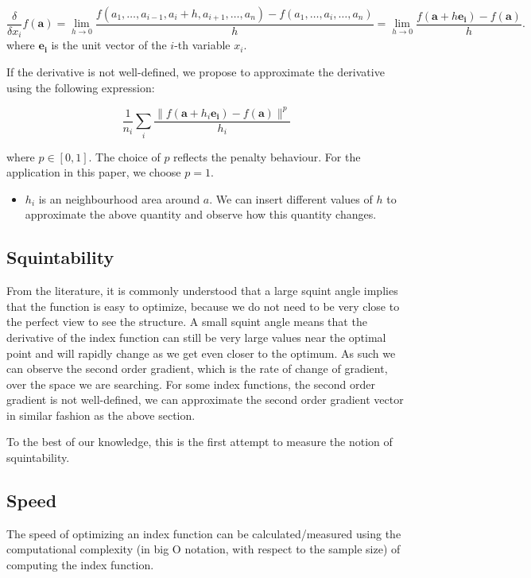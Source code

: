 \documentclass[
  number,
  preprint,
  3p]{elsarticle}
\providecommand{\tightlist}{%
  \setlength{\itemsep}{0pt}\setlength{\parskip}{0pt}}\usepackage{longtable,booktabs,array}
\begin{document}
\[
\frac{\delta}{\delta x_i} f(\mathbf{a}) =  \lim_{h \rightarrow 0} \frac{f(a_1, \ldots, a_{i-1}, a_i +h, a_{i+1}, \ldots, a_n) - f(a_1 , \ldots, a_i, \ldots, a_n)}{h} = \lim_{h\rightarrow 0} \frac{f(\mathbf{a} + h\mathbf{e_i}) - f(\mathbf{a})}{h}.
\] where \(\mathbf{e_i}\) is the unit vector of the \(i\)-th variable
\(x_i\).

If the derivative is not well-defined, we propose to approximate the
derivative using the following expression:

\[\frac{1}{n_i}\sum_{i} \frac{\|f(\mathbf{a} + h_i\mathbf{e_i}) - f(\mathbf{a})\|^p}{h_i}\]

where \(p \in [0,1]\). The choice of \(p\) reflects the penalty
behaviour. For the application in this paper, we choose \(p = 1\).

\begin{itemize}
\tightlist
\item
  \(h_i\) is an neighbourhood area around \(a\). We can insert different
  values of \(h\) to approximate the above quantity and observe how this
  quantity changes.
\end{itemize}

\subsection{Squintability}\label{squintability}

From the literature, it is commonly understood that a large squint angle
implies that the function is easy to optimize, because we do not need to
be very close to the perfect view to see the structure. A small squint
angle means that the derivative of the index function can still be very
large values near the optimal point and will rapidly change as we get
even closer to the optimum. As such we can observe the second order
gradient, which is the rate of change of gradient, over the space we are
searching. For some index functions, the second order gradient is not
well-defined, we can approximate the second order gradient vector in
similar fashion as the above section.

To the best of our knowledge, this is the first attempt to measure the
notion of squintability.

\subsection{Speed}\label{speed}

The speed of optimizing an index function can be calculated/measured
using the computational complexity (in big O notation, with respect to
the sample size) of computing the index function.
\end{document}
